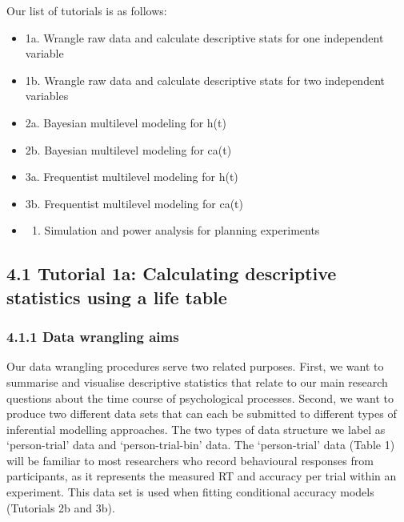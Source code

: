 \documentclass[
  man, donotrepeattitle,floatsintext]{apa6}
\providecommand{\tightlist}{%
  \setlength{\itemsep}{0pt}\setlength{\parskip}{0pt}}
\begin{document}
Our list of tutorials is as follows:

\begin{itemize}
\tightlist
\item
  1a. Wrangle raw data and calculate descriptive stats for one independent variable
\item
  1b. Wrangle raw data and calculate descriptive stats for two independent variables
\item
  2a. Bayesian multilevel modeling for h(t)
\item
  2b. Bayesian multilevel modeling for ca(t)
\item
  3a. Frequentist multilevel modeling for h(t)
\item
  3b. Frequentist multilevel modeling for ca(t)
\item
  \begin{enumerate}
  \def\labelenumi{\arabic{enumi}.}
  \setcounter{enumi}{3}
  \tightlist
  \item
    Simulation and power analysis for planning experiments
  \end{enumerate}
\end{itemize}

\subsection{4.1 Tutorial 1a: Calculating descriptive statistics using a life table}\label{tutorial-1a-calculating-descriptive-statistics-using-a-life-table}

\subsubsection{4.1.1 Data wrangling aims}\label{data-wrangling-aims}

Our data wrangling procedures serve two related purposes. First, we want to summarise and visualise descriptive statistics that relate to our main research questions about the time course of psychological processes. Second, we want to produce two different data sets that can each be submitted to different types of inferential modelling approaches. The two types of data structure we label as `person-trial' data and `person-trial-bin' data. The `person-trial' data (Table 1) will be familiar to most researchers who record behavioural responses from participants, as it represents the measured RT and accuracy per trial within an experiment. This data set is used when fitting conditional accuracy models (Tutorials 2b and 3b).
\end{document}
